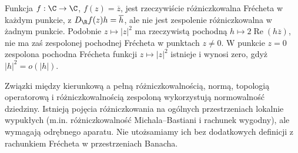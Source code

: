 \begin{przyklad}
\label{ex:complex-nonholomorphic14}
Funkcja $f:\C\to\C$, $f(z)=\overline z$, jest rzeczywiście różniczkowalna Frécheta w każdym punkcie, z $D_{\R}f(z)h=\overline h$, ale nie jest zespolenie różniczkowalna w żadnym punkcie. Podobnie $z\mapsto|z|^2$ ma rzeczywistą pochodną $h\mapsto2\operatorname{Re}(h\overline z)$, nie ma zaś zespolonej pochodnej Frécheta w punktach $z\ne0$. W punkcie $z=0$ zespolona pochodna Frécheta funkcji $z\mapsto|z|^2$ istnieje i wynosi zero, gdyż $|h|^2=o(|h|)$.
\end{przyklad}

\begin{uwaga}
Związki między kierunkową a pełną różniczkowalnością, normą, topologią operatorową i różniczkowalnością zespoloną wykorzystują normowalność dziedziny. Istnieją pojęcia różniczkowania na ogólnych przestrzeniach lokalnie wypukłych (m.in. różniczkowalność Michala--Bastiani i rachunek wygodny), ale wymagają odrębnego aparatu. Nie utożsamiamy ich bez dodatkowych definicji z rachunkiem Frécheta w przestrzeniach Banacha.
\end{uwaga}
